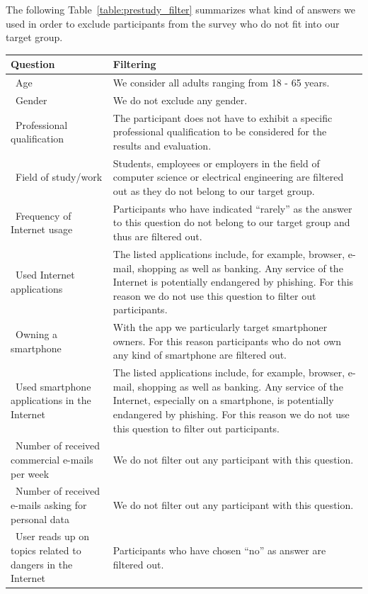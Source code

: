 The following Table~\ref{table:prestudy_filter} summarizes what kind of answers we used in order to exclude participants from the survey who do not fit into our target group.
\label{table:prestudy_filter}
\begin{center}
    \begin{tabular}{ | p{5cm} | p{10cm} |}
    \hline\textbf{Question} & \textbf{Filtering}  \\  \hline
		\hline\  Age & We consider all adults ranging from 18 - 65 years.
 \\
    \hline\  Gender & We do not exclude any gender.
 \\ 
    \hline\  Professional qualification & The participant does not have to exhibit a specific professional qualification to be considered for the results and evaluation.
 \\ 
		\hline\  Field of study/work & Students, employees or employers in the field of computer science or electrical engineering are filtered out as they do not belong to our target group.
 \\ 
	  \hline\ Frequency of Internet usage & Participants who have indicated ``rarely'' as the answer to this question do not belong to our target group and thus are filtered out.
 \\ 
	  \hline\ Used Internet applications  &  The listed applications include, for example, browser, e-mail, shopping as well as banking.
 Any service of the Internet is potentially endangered by phishing.
 For this reason we do not use this question to filter out participants.
\\ 
    \hline\ Owning a smartphone  & With the app we particularly target smartphoner owners.
 For this reason participants who do not own any kind of smartphone are filtered out.
 \\
		\hline\ Used smartphone applications in the Internet  & The listed applications include, for example, browser, e-mail, shopping as well as banking.
 Any service of the Internet, especially on a smartphone, is potentially endangered by phishing.
 For this reason we do not use this question to filter out participants.
 \\
    \hline\ Number of received commercial e-mails per week  & We do not filter out any participant with this question.
 \\
    \hline\ Number of received e-mails asking for personal data  & We do not filter out any participant with this question.
 \\
    \hline\ User reads up on topics related to dangers in the Internet  &  Participants who have chosen ``no'' as answer are filtered out.

\end{tabular}
\end{center}
